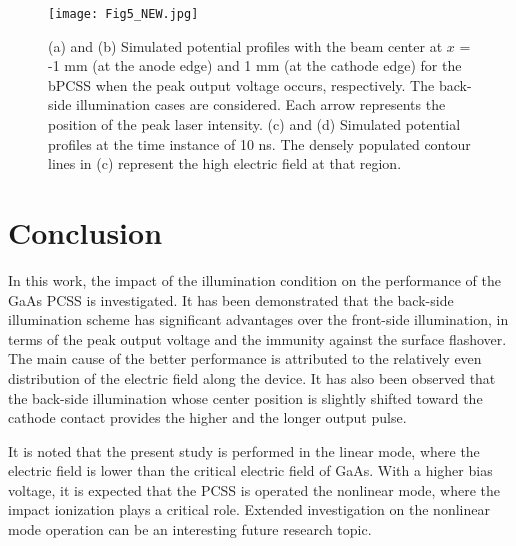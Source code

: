 \documentclass[final,5p,times,twocolumn]{elsarticle}
\newcommand{\revision}[1]{{#1}}
\begin{document}
\begin{figure}[!t]
\centering
\texttt{[image: Fig5\_NEW.jpg]}
\caption{
(a) and (b) Simulated potential profiles with the beam center at $x$ = -1 mm (at the anode edge) and 1 mm (at the cathode edge) for the bPCSS when the peak output voltage occurs, respectively. The back-side illumination cases are considered.
Each arrow represents the position of the peak laser intensity.
(c) and (d) Simulated potential profiles at the time instance of 10 ns.
The densely populated contour lines in (c) represent the high electric field at that region.
}
\end{figure}     


      
\section{Conclusion}

   In this work, the impact of the illumination condition on the performance of the GaAs PCSS is investigated.
   It has been demonstrated that the back-side illumination scheme has significant advantages over the front-side illumination, in terms of the peak output voltage and the immunity against the surface flashover. 
   The main cause of the better performance is attributed to the relatively even distribution of the electric field along the device.   
   It has also been observed that the back-side illumination whose center position is slightly shifted toward the cathode contact provides the higher and the longer output pulse. 

\revision{
   It is noted that the present study is performed in the linear mode, where the electric field is lower than the critical electric field of GaAs.
   With a higher bias voltage, it is expected that the PCSS is operated the nonlinear mode, where the impact ionization plays a critical role. 
   Extended investigation on the nonlinear mode operation can be an interesting future research topic.
}

\end{document}
